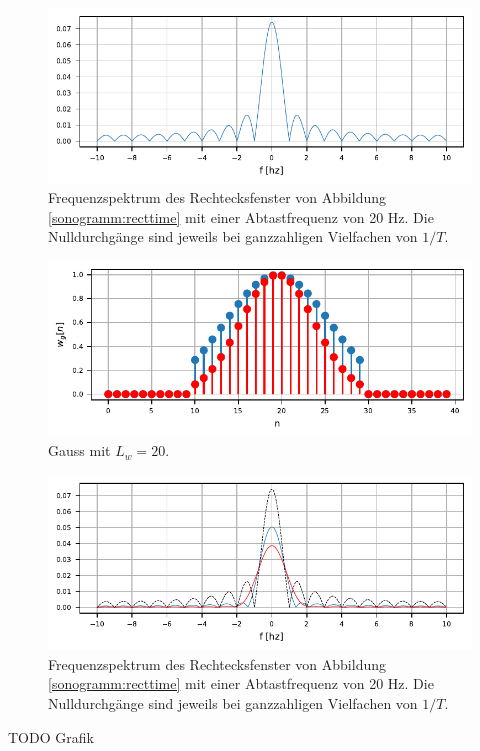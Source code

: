 \begin{figure}
    \centering
    \includegraphics{papers/sonogramm/images/rect_freq.pdf}
    \caption{Frequenzspektrum des Rechtecksfenster von Abbildung \ref{sonogramm:recttime}
    mit einer Abtastfrequenz von 20 Hz. Die Nulldurchgänge sind jeweils bei ganzzahligen Vielfachen
    von $1/T$.
    \label{sonogramm:rectfreq}
    }
\end{figure}


\begin{figure}
    \centering
    \includegraphics{papers/sonogramm/images/gauss_time.pdf}
    \caption{Gauss mit $L_w = 20$.
    \label{sonogramm:gausstime}
    }
\end{figure}

\begin{figure}
    \centering
    \includegraphics{papers/sonogramm/images/gauss_freq.pdf}
    \caption{Frequenzspektrum des Rechtecksfenster von Abbildung \ref{sonogramm:recttime}
    mit einer Abtastfrequenz von 20 Hz. Die Nulldurchgänge sind jeweils bei ganzzahligen Vielfachen
    von $1/T$.
    \label{sonogramm:gaussfreq}
    }
\end{figure}
TODO Grafik

